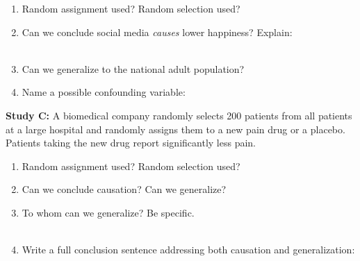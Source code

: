 \documentclass[10pt]{article}
\begin{document}
\begin{practicebox}
\small
\begin{enumerate}[leftmargin=1.5em, itemsep=7pt]
  \item Random assignment used?  \quad Random selection used? 
  \item Can we conclude social media \emph{causes} lower happiness? 
        Explain:\\
        \\[1pt]
  \item Can we generalize to the national adult population? 
  \item Name a possible confounding variable: 
\end{enumerate}
\end{practicebox}

\vspace{0.1in}

\textbf{Study C:} A biomedical company randomly selects 200 patients from all
patients at a large hospital and randomly assigns them to a new pain drug or a
placebo. Patients taking the new drug report significantly less pain.

\begin{practicebox}
\small
\begin{enumerate}[leftmargin=1.5em, itemsep=7pt]
  \item Random assignment used?  \quad Random selection used? 
  \item Can we conclude causation?  \quad Can we generalize? 
  \item To whom can we generalize? Be specific.\\
        \\[1pt]
  \item Write a full conclusion sentence addressing both causation and generalization:\\
        \\[1pt]\\[1pt]
\end{enumerate}
\end{practicebox}
\end{document}
